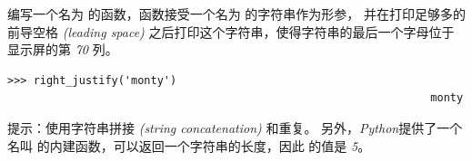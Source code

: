 \begin{exercise}
  


编写一个名为 {\em {}} 的函数，函数接受一个名为 {\em {}}的字符串作为形参， 并在打印足够多的前导空格 {\em (leading space)} 之后打印这个字符串，使得字符串的最后一个字母位于显示屏的第 {\em 70} 列。

\begin{em}
\begin{lstlisting}
>>> right_justify('monty')
                                                                 monty
\end{lstlisting}
\end{em}


提示：使用字符串拼接 {\em (string concatenation)} 和重复。 另外，{\em Python}提供了一个名叫 {\em {}} 的内建函数，可以返回一个字符串的长度，因此 {\em {}} 的值是 {\em 5}。

\end{exercise}


